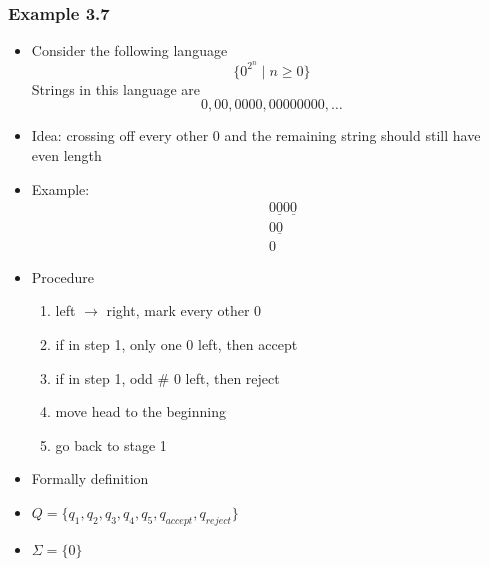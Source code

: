 \begin{frame}[allowframebreaks] \frametitle{Example 3.7}
  \begin{itemize}
\item Consider the following language
  \begin{equation*}
\{0^{2^n}\mid n \geq 0\}
\end{equation*}
Strings in this language are
\begin{equation*}
0,00,0000,00000000, \ldots
\end{equation*}
\item Idea: crossing off every other 0 and the remaining string should
  still have even length
\item Example:
  \begin{eqnarray*}
&& 0\underline{0} 0\underline{0}\\
&& 0\underline{0}\\
&& 0
  \end{eqnarray*}
\item Procedure
  \begin{enumerate}
  \item left $\rightarrow$ right, mark every other 0
  \item if in step 1, only one 0 left, then accept
  \item if in step 1, odd \# 0 left, then reject
\item move head to the beginning
\item go back to stage 1
  \end{enumerate}

\item Formally definition

\item [] $Q=\{q_1, q_2, q_3, q_4, q_5, q_{accept}, q_{reject}\}$

\item [] $\Sigma=
  \{0\}$


\end{itemize}
\end{frame}
